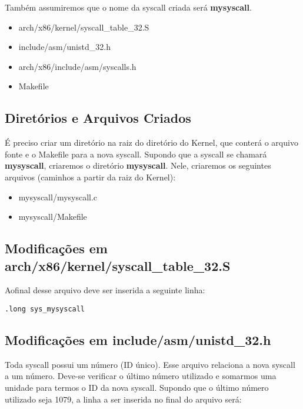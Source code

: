 \documentclass{article}
\begin{document}
Também assumiremos que o nome da syscall criada será \textbf{mysyscall}.

\begin{itemize}

	\item arch/x86/kernel/syscall\_table\_32.S
	\item include/asm/unistd\_32.h
	\item arch/x86/include/asm/syscalls.h
	\item Makefile

\end{itemize}


\subsection{Diretórios e Arquivos Criados}

É preciso criar um diretório na raiz do diretório do Kernel, que conterá o arquivo fonte e o Makefile para a nova syscall.
Supondo que a syscall se chamará \textbf{mysyscall}, criaremos o diretório \textbf{mysyscall}. Nele, criaremos os seguintes
arquivos (caminhos a partir da raiz do Kernel):

\begin{itemize}

	\item mysyscall/mysyscall.c
	\item mysyscall/Makefile

\end{itemize}


\subsection{Modificações em arch/x86/kernel/syscall\_table\_32.S}

Aofinal desse arquivo deve ser inserida a seguinte linha:

\begin{verbatim}
.long sys_mysyscall
\end{verbatim}


\subsection{Modificações em include/asm/unistd\_32.h}

Toda syscall possui um número (ID único). Esse arquivo relaciona a nova syscall a um número. Deve-se verificar o último número
utilizado e somarmos uma unidade para termos o ID da nova syscall. Supondo que o último número utilizado seja 1079, a linha a
ser inserida no final do arquivo será:
\end{document}
